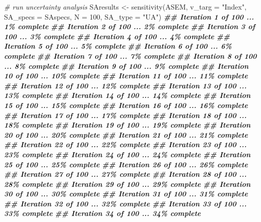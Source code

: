 \documentclass[
]{book}
\newenvironment{Shaded}{\begin{snugshade}}{\end{snugshade}}
\newcommand{\AttributeTok}[1]{\textcolor[rgb]{0.77,0.63,0.00}{#1}}
\newcommand{\CommentTok}[1]{\textcolor[rgb]{0.56,0.35,0.01}{\textit{#1}}}
\newcommand{\DecValTok}[1]{\textcolor[rgb]{0.00,0.00,0.81}{#1}}
\newcommand{\DocumentationTok}[1]{\textcolor[rgb]{0.56,0.35,0.01}{\textbf{\textit{#1}}}}
\newcommand{\FunctionTok}[1]{\textcolor[rgb]{0.00,0.00,0.00}{#1}}
\newcommand{\NormalTok}[1]{#1}
\newcommand{\OtherTok}[1]{\textcolor[rgb]{0.56,0.35,0.01}{#1}}
\newcommand{\StringTok}[1]{\textcolor[rgb]{0.31,0.60,0.02}{#1}}
\begin{document}
\begin{Shaded}
\begin{Highlighting}[]
\CommentTok{\# run uncertainty analysis}
\NormalTok{SAresults }\OtherTok{\textless{}{-}} \FunctionTok{sensitivity}\NormalTok{(ASEM, }\AttributeTok{v\_targ =} \StringTok{"Index"}\NormalTok{,}
                         \AttributeTok{SA\_specs =}\NormalTok{ SAspecs,}
                         \AttributeTok{N =} \DecValTok{100}\NormalTok{,}
                         \AttributeTok{SA\_type =} \StringTok{"UA"}\NormalTok{)}
\DocumentationTok{\#\# Iteration 1 of 100 ... 1\% complete}
\DocumentationTok{\#\# Iteration 2 of 100 ... 2\% complete}
\DocumentationTok{\#\# Iteration 3 of 100 ... 3\% complete}
\DocumentationTok{\#\# Iteration 4 of 100 ... 4\% complete}
\DocumentationTok{\#\# Iteration 5 of 100 ... 5\% complete}
\DocumentationTok{\#\# Iteration 6 of 100 ... 6\% complete}
\DocumentationTok{\#\# Iteration 7 of 100 ... 7\% complete}
\DocumentationTok{\#\# Iteration 8 of 100 ... 8\% complete}
\DocumentationTok{\#\# Iteration 9 of 100 ... 9\% complete}
\DocumentationTok{\#\# Iteration 10 of 100 ... 10\% complete}
\DocumentationTok{\#\# Iteration 11 of 100 ... 11\% complete}
\DocumentationTok{\#\# Iteration 12 of 100 ... 12\% complete}
\DocumentationTok{\#\# Iteration 13 of 100 ... 13\% complete}
\DocumentationTok{\#\# Iteration 14 of 100 ... 14\% complete}
\DocumentationTok{\#\# Iteration 15 of 100 ... 15\% complete}
\DocumentationTok{\#\# Iteration 16 of 100 ... 16\% complete}
\DocumentationTok{\#\# Iteration 17 of 100 ... 17\% complete}
\DocumentationTok{\#\# Iteration 18 of 100 ... 18\% complete}
\DocumentationTok{\#\# Iteration 19 of 100 ... 19\% complete}
\DocumentationTok{\#\# Iteration 20 of 100 ... 20\% complete}
\DocumentationTok{\#\# Iteration 21 of 100 ... 21\% complete}
\DocumentationTok{\#\# Iteration 22 of 100 ... 22\% complete}
\DocumentationTok{\#\# Iteration 23 of 100 ... 23\% complete}
\DocumentationTok{\#\# Iteration 24 of 100 ... 24\% complete}
\DocumentationTok{\#\# Iteration 25 of 100 ... 25\% complete}
\DocumentationTok{\#\# Iteration 26 of 100 ... 26\% complete}
\DocumentationTok{\#\# Iteration 27 of 100 ... 27\% complete}
\DocumentationTok{\#\# Iteration 28 of 100 ... 28\% complete}
\DocumentationTok{\#\# Iteration 29 of 100 ... 29\% complete}
\DocumentationTok{\#\# Iteration 30 of 100 ... 30\% complete}
\DocumentationTok{\#\# Iteration 31 of 100 ... 31\% complete}
\DocumentationTok{\#\# Iteration 32 of 100 ... 32\% complete}
\DocumentationTok{\#\# Iteration 33 of 100 ... 33\% complete}
\DocumentationTok{\#\# Iteration 34 of 100 ... 34\% complete}

\end{Highlighting}
\end{Shaded}
\end{document}
